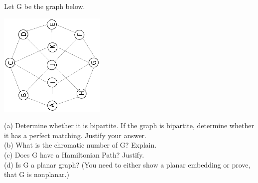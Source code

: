 \documentclass{article}
\begin{document}
\begin{problem}
Let G be the graph below. 
	\begin{center}
		\includegraphics[angle = 270, width = 2in]{HW5_pics/Graph1HW5.eps}
	\end{center}
	
\noindent (a) Determine whether it is bipartite. If the graph is bipartite, determine whether it has a perfect matching. Justify your answer.\\
(b) What is the chromatic number of G? Explain.\\
(c) Does G have a Hamiltonian Path? Justify.\\
(d) Is G a planar graph? (You need to either show a planar embedding or prove, that G is nonplanar.)
\end{problem}
\end{document}
